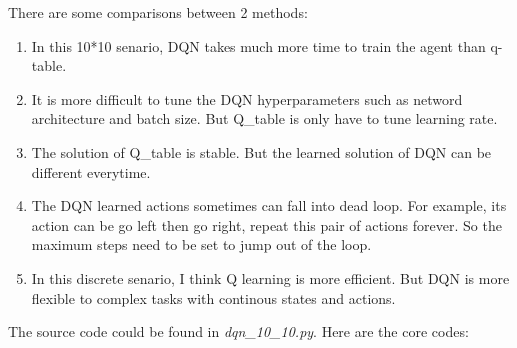\documentclass[a4paper]{article}
\begin{document}
\begin{enumerate}
  \newline There are some comparisons between 2 methods:
  \begin{enumerate}
    \item In this 10*10 senario, DQN takes much more time to train the agent than q-table. 
    \item It is more difficult to tune the DQN hyperparameters such as netword architecture and batch size. But Q\_table is only have to tune learning rate.
    \item The solution of Q\_table is stable. But the learned solution of DQN can be different everytime.
    \item The DQN learned actions sometimes can fall into dead loop. For example, its action can be go left then go right, repeat this pair of actions forever. So the maximum steps need to be set to jump out of the loop.
    \item In this discrete senario, I think Q learning is more efficient. But DQN is more flexible to complex tasks with continous states and actions.
  \end{enumerate}

  The source code could be found in \emph{dqn\_10\_10.py}. Here are the core codes:
  
\end{enumerate}
  
  
  
\end{document}
